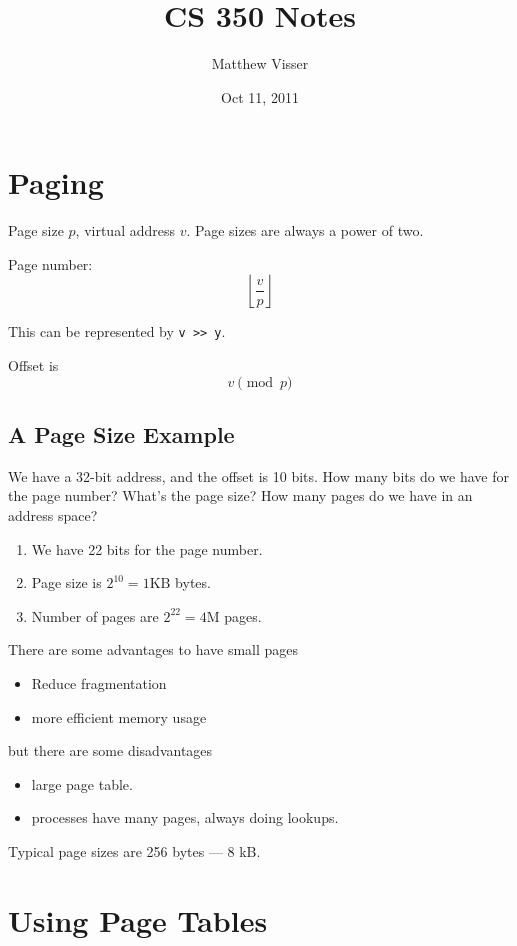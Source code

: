 \documentclass[12pt]{article}
\begin{document}
\title{CS 350 Notes}
\author{Matthew Visser}
\date{Oct 11, 2011}
\maketitle

\section{Paging}

Page size $p$, virtual address $v$. Page sizes are always a power of two.

Page number:
\begin{equation}
	\left \lfloor \frac{v}{p} \right \rfloor
\end{equation}

This can be represented by \texttt{v >> y}.

Offset is
\begin{equation}
	v \pmod p
\end{equation}

\subsection{A Page Size Example}
We have a 32-bit address, and the offset is 10 bits.  How many bits do we have
for the page number? What's the page size? How many pages do we have in an
address space?

\begin{enumerate}
	\item We have 22 bits for the page number.
	\item Page size is $2^10 = 1\text{KB}$ bytes.
	\item Number of pages are $2^22 = 4\text{M}$ pages. 
\end{enumerate}

There are some advantages to have small pages
\begin{itemize}
	\item Reduce fragmentation
	\item more efficient memory usage
\end{itemize}
but there are some disadvantages
\begin{itemize}
	\item large page table.
	\item processes have many pages, always doing lookups.
\end{itemize}
Typical page sizes are 256 bytes --- 8 kB.

\section{Using Page Tables}
\end{document}
